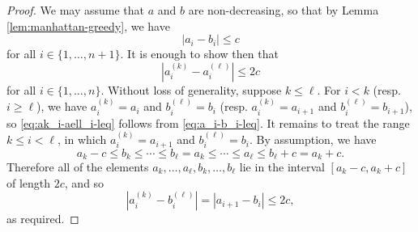 \documentclass[reqno]{amsart}
\theoremstyle{plain} \newtheorem{theorem} {Theorem}
\theoremstyle{definition} \newtheorem{definition} [theorem] {Definition}
\theoremstyle{itplain} %
\numberwithin{equation}{section}
\numberwithin{theorem}{section}
\renewcommand{\geq}{\geqslant}
\renewcommand{\leq}{\leqslant}
\begin{document}
\begin{proof}
  We may assume that $a$ and $b$ are non-decreasing, so that by Lemma \ref{lem:manhattan-greedy}, we have
  \begin{equation}\label{eq:a_i-b_i-leq}
    |a_i - b_i| \leq c
  \end{equation}
  for all $i \in \{1,\dotsc,n+1\}$.  It is enough to show then that
  \begin{equation}\label{eq:ak_i-aell_i-leq}
    |a^{(k)}_i - a^{(\ell)}_i| \leq 2 c
\end{equation}
for all $i \in \{1,\dotsc,n\}$.  Without loss of generality, suppose $k \leq \ell$.  For $i < k$ (resp. $i \geq \ell$), we have $a^{(k)}_i = a_i$ and $b^{(\ell)}_i = b_i$ (resp. $a^{(k)}_i = a_{i+1}$ and $b^{(\ell)}_i = b_{i+1}$), so \eqref{eq:ak_i-aell_i-leq} follows from \eqref{eq:a_i-b_i-leq}.  It remains to treat the range $k \leq i < \ell$, in which $a_i^{(k)} = a_{i+1}$ and $b_i^{(\ell)} = b_i$.  By assumption, we have
\begin{equation*}
  a_k - c \leq b_k \leq \dotsb \leq b_{\ell} = a_k \leq \dotsb \leq a_{\ell} \leq b_{\ell} + c = a_k + c.
\end{equation*}
Therefore all of the elements $a_k,\dotsc,a_{\ell}, b_k,\dotsc,b_{\ell}$ lie in the interval $[a_k-c, a_k+c]$ of length $2 c$, and so
\begin{equation*}
  |a_i^{(k)} - b_i^{(\ell)}| = |a_{i+1} - b_i| \leq 2 c,
\end{equation*}
as required.
\end{proof}
\end{document}
